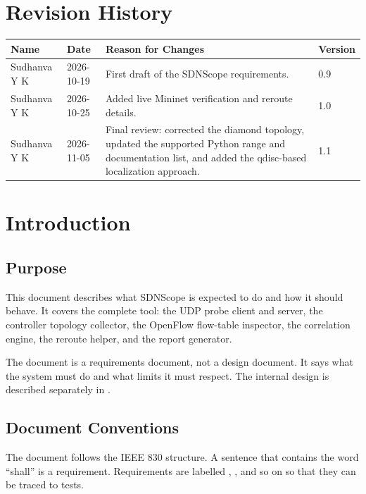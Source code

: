 \documentclass[11pt,a4paper]{article}
\newcommand{\code}[1]{\texttt{\detokenize{#1}}}
\begin{document}
\section*{Revision History}
\renewcommand{\arraystretch}{1.35}
\begin{center}
\begin{tabular}{|p{4.0cm}|p{2.2cm}|p{6.8cm}|p{1.5cm}|}
\hline
\textbf{Name} & \textbf{Date} & \textbf{Reason for Changes} & \textbf{Version} \\
\hline
Sudhanva Y K & 2026-10-19 & First draft of the SDNScope requirements. & 0.9 \\
\hline
Sudhanva Y K & 2026-10-25 & Added live Mininet verification and reroute details. & 1.0 \\
\hline
Sudhanva Y K & 2026-11-05 & Final review: corrected the diamond topology, updated the supported Python range and documentation list, and added the qdisc-based localization approach. & 1.1 \\
\hline
\end{tabular}
\end{center}

\newpage

\section{Introduction}

\subsection{Purpose}
This document describes what SDNScope is expected to do and how it should behave. It covers the complete tool: the UDP probe client and server, the controller topology collector, the OpenFlow flow-table inspector, the correlation engine, the reroute helper, and the report generator.

The document is a requirements document, not a design document. It says what the system must do and what limits it must respect. The internal design is described separately in \code{docs/DESIGN.md}.

\subsection{Document Conventions}
The document follows the IEEE 830 structure. A sentence that contains the word ``shall'' is a requirement. Requirements are labelled \code{REQ-1}, \code{REQ-2}, and so on so that they can be traced to tests.
\end{document}
